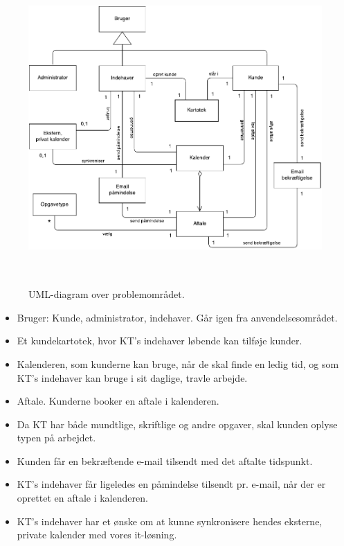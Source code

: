 \documentclass[12pt]{article}   %
\begin{document}
\begin{figure}[!ht]
\begin{center}
\includegraphics[width=12cm, height=12cm]{problemomr.pdf}
\caption{UML-diagram over problemområdet.}
\label{fig:problem}
\end{center}
\end{figure}

\begin{itemize}
\item Bruger: Kunde, administrator, indehaver. Går igen fra
	anvendelsesområdet.
\item Et kundekartotek, hvor KT's indehaver løbende kan tilføje kunder.
\item Kalenderen, som kunderne kan bruge, når de skal finde en ledig tid, og som KT's indehaver kan bruge i sit daglige, travle arbejde.
\item Aftale. Kunderne booker en aftale i kalenderen.
\item Da KT har både mundtlige, skriftlige og andre opgaver, skal kunden	oplyse typen på arbejdet.
\item Kunden får en bekræftende e-mail tilsendt med det aftalte tidspunkt.
\item KT's indehaver får ligeledes en påmindelse tilsendt pr. e-mail, når der er oprettet en aftale i kalenderen. 
\item KT's indehaver har et ønske om at kunne synkronisere hendes eksterne, private kalender med vores it-løsning.
\end{itemize}
\end{document}
